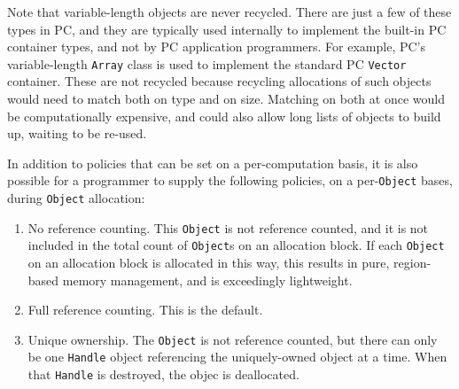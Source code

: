 Note that
variable-length objects are never recycled.  There are just a few of these types in PC, and they are typically
used internally to implement the built-in PC container
types, and not by PC application programmers.  For example, PC's variable-length
\texttt{Array} class is used to implement the standard PC \texttt{Vector} container.  
These are not recycled because recycling allocations of such objects would need to match both on type and on size.  Matching on both at once would 
be computationally expensive, and could also allow long lists of objects to build up, waiting to be re-used.

In addition to policies that can be set on a per-computation basis,
it is also possible for a programmer to supply the following policies, on a per-\texttt{Object} bases, during \texttt{Object} allocation:

\begin{enumerate}

\item No reference counting.  This \texttt{Object} is not reference counted, and it is not included in the total count of \texttt{Object}s on an allocation
block.  If each \texttt{Object} on an allocation block
is allocated in this way, this results in pure, region-based memory management, and is exceedingly lightweight.
\item Full reference counting.  This is the default.
\item Unique ownership.  The \texttt{Object} is not reference counted, but there can only be one \texttt{Handle} object referencing the uniquely-owned
object at a time.  When that \texttt{Handle} is destroyed, the objec is deallocated.

\end{enumerate}


